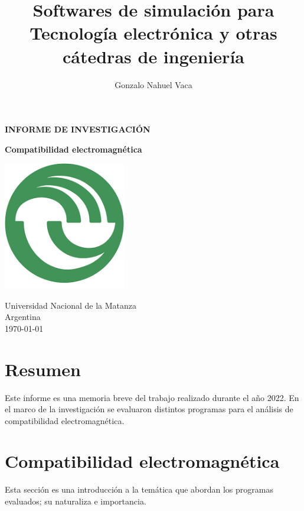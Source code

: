 \documentclass[
    11pt,
    spanish,
    a4paper
]{article}
\title{Softwares de simulación para Tecnología electrónica y otras cátedras de ingeniería}
\author{Gonzalo Nahuel Vaca}
\def\doctype{INFORME DE INVESTIGACIÓN}
\begin{document}
\makeatletter
\begin{titlepage}
	\begin{center}
		\vspace*{1cm}

		\Huge
		\textbf{\doctype}
		\vspace{0.5cm}

		\LARGE
		\@title
		\vspace{0.5cm}

		\textbf{Compatibilidad electromagnética}

		\vspace{1.5cm}

		\textbf{\@author}

		\vspace{1.5cm}

		\includegraphics[width=0.4\textwidth]{img/logoUNLaM.png}

		\vfill
		Universidad Nacional de la Matanza\\
		Argentina\\
		\today
	\end{center}
\end{titlepage}
\makeatother
\newpage

\section*{Resumen}

Este informe es una memoria breve del trabajo realizado durante el año 2022.
En el marco de la investigación se evaluaron distintos programas para el análisis de compatibilidad electromagnética.

\section{Compatibilidad electromagnética}

Esta sección es una introducción a la temática que abordan los programas evaluados; su naturaliza e importancia.
\end{document}
